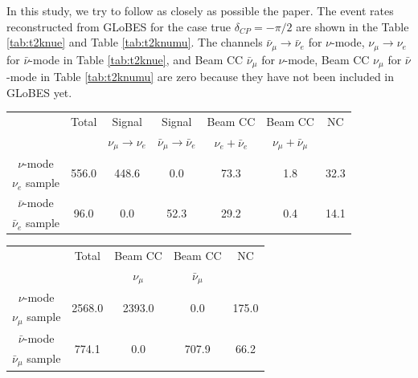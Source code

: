 \documentclass[a4 paper,12pt]{report}%
\begin{document}
In this study, we try to follow as closely as possible the paper. The event rates reconstructed from GLoBES for the case true $\delta_{CP} =  -\pi/2$ are shown in the Table \ref{tab:t2knue} and Table \ref{tab:t2knumu}. The channels $\bar{\nu}_\mu \rightarrow \bar{\nu}_e$ for $\nu$-mode, $\nu_\mu \rightarrow \nu_e$ for $\bar{\nu}$-mode in Table \ref{tab:t2knue}, and Beam CC $\bar{\nu}_\mu$ for $\nu$-mode, Beam CC $\nu_\mu$ for $\bar{\nu}$-mode in Table \ref{tab:t2knumu} are zero because they have not been included in GLoBES yet.  
\begin{center}
\label{tab:t2knue}
\begin{tabular}{|c| c| c| c| c| c| c|}
\hline
  &  Total & Signal & Signal  &  Beam CC   & Beam CC  & NC \\ 
  &        & $\nu_\mu \rightarrow \nu_e$&$\bar{\nu}_\mu \rightarrow \bar{\nu}_e$ &   $\nu_e + \bar{\nu}_e$ &  $\nu_\mu + \bar{\nu}_\mu$ &  \\
 \hline  
 $\nu$-mode &  \multirow{2}{*}{556.0} & \multirow{2}{*}{448.6} & \multirow{2}{*}{0.0} & \multirow{2}{*}{73.3} & \multirow{2}{*}{1.8} & \multirow{2}{*}{32.3} \\
 $\nu_e$ sample & &&&& &\\ 
\hline 
$\bar{\nu}$-mode &  \multirow{2}{*}{96.0} & \multirow{2}{*}{0.0} & \multirow{2}{*}{52.3}  & \multirow{2}{*}{29.2} & \multirow{2}{*}{0.4} & \multirow{2}{*}{14.1} \\
 $\bar{\nu}_e$ sample & &&&& &\\ 
\hline 
\end{tabular} 
\end{center}

\vspace{0.5cm}
\begin{center} 
\label{tab:t2knumu}
\begin{tabular}{|c| c| c| c| c| }
\hline
  &  Total & Beam CC  &  Beam CC   &   NC \\ 
  &        & $\nu_\mu $ &   $ \bar{\nu}_\mu$ &    \\
 
  \hline  
 $\nu$-mode & \multirow{2}{*}{2568.0}  & \multirow{2}{*}{2393.0} & \multirow{2}{*}{0.0} & \multirow{2}{*}{175.0} \\
 $\nu_\mu$ sample & &&&\\ 
\hline 
$\bar{\nu}$-mode &  \multirow{2}{*}{774.1} & \multirow{2}{*}{0.0} & \multirow{2}{*}{707.9} & \multirow{2}{*}{66.2} \\
 $\bar{\nu}_\mu$ sample  &&&&\\ 
\hline 
\end{tabular} 
\end{center}
\end{document}
